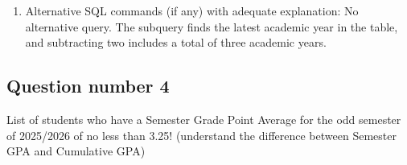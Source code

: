 \begin{enumerate}
    \begin{align*}
    Y &\leftarrow
    \gamma_{\substack{
        \operatorname{MAX}(
        \operatorname{startYear}(\text{academic\_year})
        )\\
        \rightarrow \text{latestYear}
    }}(\text{AvailableClasses}) \\[4pt]
    J &\leftarrow
    \Big(
    \rho_{ac}(\text{AvailableClasses})
    \bowtie_{ac.\text{nim}=s.\text{nim}}
    \rho_s(\text{students})
    \Big) \\[-2pt]
    &\qquad
    \bowtie_{ac.\text{course\_id}=c.\text{course\_id}}
    \rho_c(\text{courses}) \\[4pt]
    F &\leftarrow
    \sigma_{\substack{
        \operatorname{LOWER}(s.\text{program})
        =\text{'computer science'}\\
        \land\ c.\text{type}='E'\\
        \land\
        \operatorname{startYear}
        (ac.\text{academic\_year})
        \ge \text{latestYear}-2
    }}(J \times Y) \\[4pt]
    G &\leftarrow
    {}_{c.\text{course\_id},c.\text{course\_name}}
    \gamma_{\substack{
        \operatorname{COUNT}(
        \operatorname{DISTINCT}\ ac.\text{nim}
        )\\
        \rightarrow \text{total\_enrollees}
    }}(F) \\[4pt]
    R &\leftarrow
    \operatorname{Top}_3
    \Big(
    \tau_{\text{total\_enrollees}\downarrow,\,
           c.\text{course\_id}\uparrow}(G)
    \Big)
    \end{align*}

    Here, \texttt{startYear} takes the first four digits of the academic year. The latest year is used to select the last three academic years. \(\operatorname{Top}_3\) means only the first three courses are selected after sorting.

    \item Alternative SQL commands (if any) with adequate explanation: No alternative query. The subquery finds the latest academic year in the table, and subtracting two includes a total of three academic years.
\end{enumerate}

\subsection{Question number 4}

\begin{tcolorbox}
List of students who have a Semester Grade Point Average for the odd semester of 2025/2026 of no less than 3.25! (understand the difference between Semester GPA and Cumulative GPA)
\end{tcolorbox}

